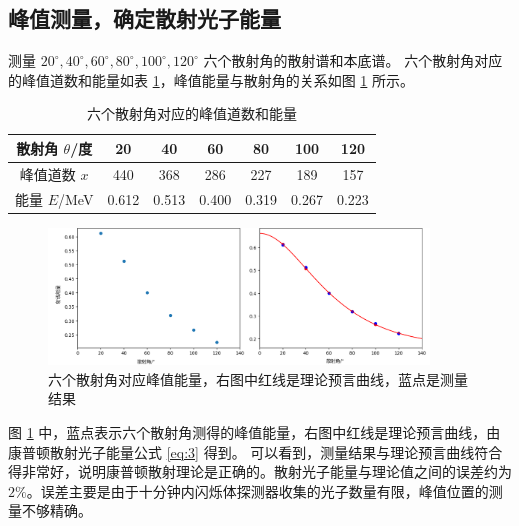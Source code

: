 \documentclass[revtex4-2]{mpltx}
\begin{document}
\subsection{峰值测量，确定散射光子能量}
测量 $20^\circ,40^\circ,60^\circ,80^\circ,100^\circ,120^\circ$ 六个散射角的散射谱和本底谱。
六个散射角对应的峰值道数和能量如表 \ref{tab:2}，峰值能量与散射角的关系如图 \ref{fig:4} 所示。
\begin{table}[htbp]
    \centering
    \caption{六个散射角对应的峰值道数和能量}
    \label{tab:2}
    \begin{tabular}{ccccccc}
        \hline
        散射角 $\theta$/度 & 20 & 40 & 60 & 80 & 100 & 120 \\
        \hline
        峰值道数 $x$ &  440 &368 &286 &227 &189 &157\\
        能量 $E$/MeV & 0.612 & 0.513 & 0.400 & 0.319 & 0.267 & 0.223 \\
        \hline
    \end{tabular}
\end{table}
\begin{figure}[htbp]
    \centering
    \includegraphics[width=0.9\textwidth]{4.png}
    \caption{六个散射角对应峰值能量，右图中红线是理论预言曲线，蓝点是测量结果}
    \label{fig:4}
\end{figure}

图 \ref{fig:4} 中，蓝点表示六个散射角测得的峰值能量，右图中红线是理论预言曲线，由康普顿散射光子能量公式 \eqref{eq:3} 得到。
可以看到，测量结果与理论预言曲线符合得非常好，说明康普顿散射理论是正确的。散射光子能量与理论值之间的误差约为
$2\%$。误差主要是由于十分钟内闪烁体探测器收集的光子数量有限，峰值位置的测量不够精确。
\end{document}
